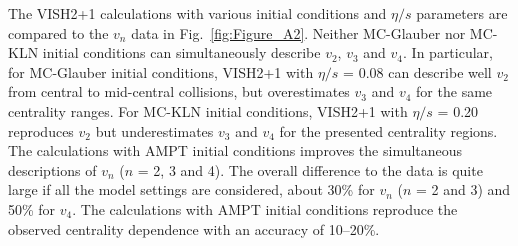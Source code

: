 The VISH2+1 calculations with various initial conditions and $\eta/s$ parameters are compared to the $v_n$ data in Fig.~\ref{fig:Figure_A2}.
Neither MC-Glauber nor MC-KLN initial conditions can simultaneously describe $v_2$, $v_3$ and $v_4$. In particular, for MC-Glauber initial conditions, VISH2+1 with $\eta/s$ = 0.08 can describe well $v_2$ from central to mid-central collisions, but overestimates $v_3$ and $v_4$ for the same centrality ranges. For MC-KLN initial conditions, VISH2+1 with $\eta/s$ = 0.20 reproduces $v_2$ but underestimates $v_3$ and $v_4$ for the presented centrality regions. The calculations with AMPT initial conditions improves the simultaneous descriptions of $v_n$ ($n$ = 2, 3 and 4). The overall difference to the data is quite large if all the model settings are considered, about 30\% for $v_n$ ($n$ = 2 and 3) and 50\% for $v_4$. The calculations with AMPT initial conditions reproduce the observed centrality dependence with an accuracy of 10--20\%.

